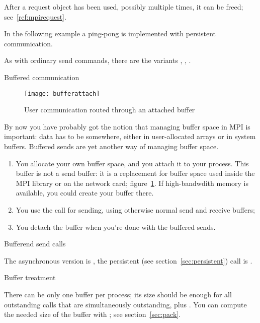 After a request object has been used, possibly multiple times, it can be freed; see~\ref{ref:mpirequest}.

In the following example a ping-pong is implemented with persistent communication.
%

As with ordinary send commands, there are the variants
,
,
.


 {Buffered communication}
\label{sec:buffered}

\begin{figure}[ht]
  \texttt{[image: bufferattach]}
  \caption{User communication routed through an attached buffer}
  \label{fig:bufattach}
\end{figure}

By now you have probably got the notion that managing buffer
space in MPI is important: data has to be somewhere, either in
user-allocated arrays or in system buffers. Buffered sends are yet another
way of managing buffer space.
\begin{enumerate}
\item You allocate your own buffer space, and you attach it to your
  process. This buffer is not a send buffer: it is a replacement for
  buffer space used inside the MPI library or on the network card;
  figure~\ref{fig:bufattach}. If high-bandwdith memory is available,
  you could create your buffer there.
\item You use the  call for sending, using
  otherwise normal send and receive buffers;
\item You detach the buffer when you're done with the buffered sends.
\end{enumerate}

 {Bufferend send calls}


The asynchronous version is , the persistent
(see section~\ref{sec:persistent}) call is .

 {Buffer treatment}

There can be only one buffer per process; its size should be enough
for all outstanding  calls that are simultaneously
outstanding, plus .
You can compute the needed size of the buffer with ;
see section~\ref{sec:pack}.

